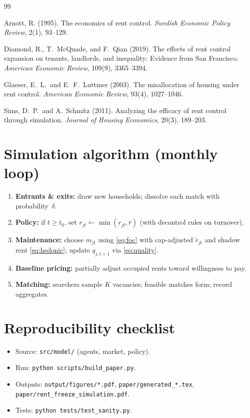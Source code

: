 \documentclass[11pt,a4paper]{article}
\begin{document}

\begin{thebibliography}{99}

Arnott, R. (1995).
\newblock The economics of rent control.
\newblock \emph{Swedish Economic Policy Review}, 2(1), 93--129.

Diamond, R., T.\ McQuade, and F.\ Qian (2019).
\newblock The effects of rent control expansion on tenants, landlords, and inequality: Evidence from San Francisco.
\newblock \emph{American Economic Review}, 109(9), 3365--3394.

Glaeser, E.\ L.\ and E.\ F.\ Luttmer (2003).
\newblock The misallocation of housing under rent control.
\newblock \emph{American Economic Review}, 93(4), 1027--1046.

Sims, D.\ P.\ and A.\ Schmitz (2011).
\newblock Analyzing the efficacy of rent control through simulation.
\newblock \emph{Journal of Housing Economics}, 20(3), 189--203.

\end{thebibliography}

\appendix
\section{Simulation algorithm (monthly loop)}

\begin{enumerate}
    \item \textbf{Entrants \& exits:} draw new households; dissolve each match with probability~$\delta$.
    \item \textbf{Policy:} if $t\ge t_0$, set $r_{jt}\leftarrow\min(r_{jt},\bar r)$ (with decontrol rules on turnover).
    \item \textbf{Maintenance:} choose $m_{jt}$ using \eqref{eq:foc} with cap-adjusted $\tilde r_{jt}$ and shadow rent \eqref{eq:hedonic}; update $q_{j,t+1}$ via \eqref{eq:quality}.
    \item \textbf{Baseline pricing:} partially adjust occupied rents toward willingness to pay.
    \item \textbf{Matching:} searchers sample $K$ vacancies; feasible matches form; record aggregates.
\end{enumerate}

\section{Reproducibility checklist}

\begin{itemize}
    \item Source: \texttt{src/model/} (agents, market, policy).
    \item Run: \texttt{python scripts/build\_paper.py}.
    \item Outputs: \texttt{output/figures/*.pdf}, \texttt{paper/generated\_*.tex}, \texttt{paper/rent\_freeze\_simulation.pdf}.
    \item Tests: \texttt{python tests/test\_sanity.py}.
\end{itemize}
\end{document}
